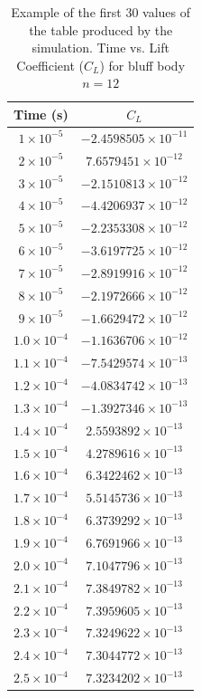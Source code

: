 \begin{table}[H]
	\centering
	\renewcommand{\arraystretch}{1.3}
	\begin{tabular}{|c|c|}
		\hline
		\textbf{Time (s)} & \textbf{$C_L$} \\
		\hline
		$1 \times 10^{-5}$  & $-2.4598505 \times 10^{-11}$ \\
		$2 \times 10^{-5}$  & $7.6579451 \times 10^{-12}$ \\
		$3 \times 10^{-5}$  & $-2.1510813 \times 10^{-12}$ \\
		$4 \times 10^{-5}$  & $-4.4206937 \times 10^{-12}$ \\
		$5 \times 10^{-5}$  & $-2.2353308 \times 10^{-12}$ \\
		$6 \times 10^{-5}$  & $-3.6197725 \times 10^{-12}$ \\
		$7 \times 10^{-5}$  & $-2.8919916 \times 10^{-12}$ \\
		$8 \times 10^{-5}$  & $-2.1972666 \times 10^{-12}$ \\
		$9 \times 10^{-5}$  & $-1.6629472 \times 10^{-12}$ \\
		$1.0 \times 10^{-4}$ & $-1.1636706 \times 10^{-12}$ \\
		$1.1 \times 10^{-4}$ & $-7.5429574 \times 10^{-13}$ \\
		$1.2 \times 10^{-4}$ & $-4.0834742 \times 10^{-13}$ \\
		$1.3 \times 10^{-4}$ & $-1.3927346 \times 10^{-13}$ \\
		$1.4 \times 10^{-4}$ & $2.5593892 \times 10^{-13}$ \\
		$1.5 \times 10^{-4}$ & $4.2789616 \times 10^{-13}$ \\
		$1.6 \times 10^{-4}$ & $6.3422462 \times 10^{-13}$ \\
		$1.7 \times 10^{-4}$ & $5.5145736 \times 10^{-13}$ \\
		$1.8 \times 10^{-4}$ & $6.3739292 \times 10^{-13}$ \\
		$1.9 \times 10^{-4}$ & $6.7691966 \times 10^{-13}$ \\
		$2.0 \times 10^{-4}$ & $7.1047796 \times 10^{-13}$ \\
		$2.1 \times 10^{-4}$ & $7.3849782 \times 10^{-13}$ \\
		$2.2 \times 10^{-4}$ & $7.3959605 \times 10^{-13}$ \\
		$2.3 \times 10^{-4}$ & $7.3249622 \times 10^{-13}$ \\
		$2.4 \times 10^{-4}$ & $7.3044772 \times 10^{-13}$ \\
		$2.5 \times 10^{-4}$ & $7.3234202 \times 10^{-13}$ \\
		\hline
	\end{tabular}
	\label{tab:12FaceClTable}
	\caption{Example of the first 30 values of the table produced by the simulation. Time vs. Lift Coefficient ($C_L$) for bluff body $n=12$}
\end{table}

